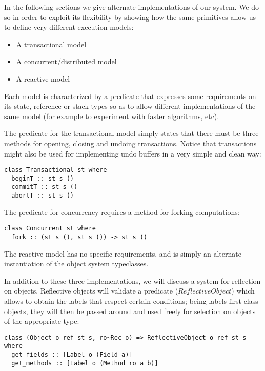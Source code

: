 In the following sections we give alternate implementations of our system. We do so in order to exploit its flexibility by showing how the same primitives allow us to define very different execution models:
\begin{itemize}
\item A transactional model
\item A concurrent/distributed model
\item A reactive model
\end{itemize}

Each model is characterized by a predicate that expresses some requirements on its state, reference or stack types so as to allow different implementations of the same model (for example to experiment with faster algorithms, etc).

The predicate for the transactional model simply states that there must be three methods for opening, closing and undoing transactions. Notice that transactions might also be used for implementing undo buffers in a very simple and clean way:
\begin{lstlisting}
class Transactional st where
  beginT :: st s ()
  commitT :: st s ()
  abortT :: st s ()
\end{lstlisting}

The predicate for concurrency requires a method for forking computations:
\begin{lstlisting}
class Concurrent st where
  fork :: (st s (), st s ()) -> st s ()
\end{lstlisting}

The reactive model has no specific requirements, and is simply an alternate instantiation of the object system typeclasses.

In addition to these three implementations, we will discuss a system for reflection on objects. Reflective objects will validate a predicate ($ReflectiveObject$) which allows to obtain the labels that respect certain conditions; being labels first class objects, they will then be passed around and used freely for selection on objects of the appropriate type:
\begin{lstlisting}
class (Object o ref st s, ro~Rec o) => ReflectiveObject o ref st s where
  get_fields :: [Label o (Field a)]
  get_methods :: [Label o (Method ro a b)]
\end{lstlisting}
